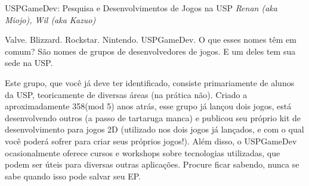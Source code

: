 \begin{secao}{USPGameDev: Pesquisa e Desenvolvimentos de Jogos na USP}
{\em Renan (aka Miojo), Wil (aka Kazuo)}

Valve. Blizzard. Rockstar. Nintendo. USPGameDev. O que esses nomes têm em comum?
São nomes de grupos de desenvolvedores de jogos. E um deles tem sua sede na USP.

Este grupo, que você já deve ter identificado, consiste primariamente de alunos
da USP, teoricamente de diversas áreas (na prática não). Criado a aproximadamente
358(mod 5) anos atrás, esse grupo já lançou dois jogos, está desenvolvendo
outros (a passo de tartaruga manca) e publicou seu próprio kit de desenvolvimento
para jogos 2D (utilizado nos dois jogos já lançados, e com o qual você poderá
sofrer para criar seus próprios jogos!). Além disso, o USPGameDev ocasionalmente
oferece cursos e workshops sobre tecnologias utilizadas, que podem ser úteis para
diversas outras aplicações. Procure ficar sabendo, nunca se sabe quando isso pode
salvar seu EP. 
\end{secao}
